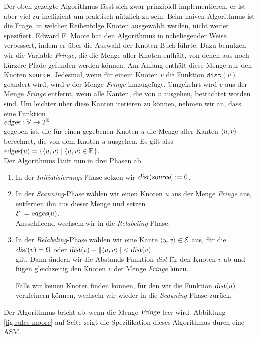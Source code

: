 \noindent
Der oben gezeigte Algorithmus l\"asst sich zwar prinzipiell implementieren, er ist aber 
viel zu ineffizient um praktisch n\"utzlich zu sein.
Beim naiven Algorithmus ist die Frage, in welcher Reihenfolge Knoten ausgew\"ahlt werden,
nicht weiter spezifiert.   Edward F. Moore \cite{moore:59} hat den Algorithmus in naheliegender Weise
verbessert,  indem er \"uber die Auswahl der Knoten Buch f\"uhrte.  
Dazu benutzen wir die Variable \textsl{Fringe}, die die Menge aller Knoten enth\"alt, von denen aus
noch k\"urzere Pfade gefunden werden k\"onnen.  Am Anfang enth\"alt diese Menge nur den Knoten
\texttt{source}.  Jedesmal, wenn f\"ur einem Knoten $v$ die Funktion
$\mathtt{dist}(v)$ ge\"andert wird, wird $v$ der Menge \textsl{Fringe} hinzugef\"ugt.
Umgekehrt wird $v$ aus der Menge \textsl{Fringe} entfernt, wenn alle Kanten, die von $v$
ausgehen, betrachtet worden sind.  Um leichter \"uber diese Kanten iterieren zu k\"onnen,
nehmen wir an, dass eine Funktion \\[0.2cm]
\hspace*{1.3cm} $\textsl{edges}: {\mathbb V} \rightarrow 2^{{\mathbb E}}$ \\[0.2cm]
gegeben ist, die f\"ur einen gegebenen Knoten $u$ die Menge aller Kanten $\pair(u,v)$
berechnet, die von dem Knoten $u$ ausgehen.  Es gilt also \\[0.2cm]
\hspace*{1.3cm} $\textsl{edges}(u) = \{ \pair(u,v) \mid \pair(u,v) \in \edges \}$.
\\[0.2cm]
Der Algorithmus l\"auft nun in drei Phasen ab.
\begin{enumerate}
\item In der \emph{Initialisierungs}-Phase setzen wir $\textsl{dist}(\textsl{source}) := 0$.
\item In der \emph{Scanning}-Phase w\"ahlen wir einen Knoten $u$ aus der Menge \textsl{Fringe} aus,
      entfernen ihn aus dieser Menge und setzen \\[0.2cm]
      \hspace*{1.3cm} ${\cal E} := \textsl{edges}(u)$. \\[0.2cm]
      Ansschlie\3end wechseln wir in die \emph{Relabeling}-Phase.
\item In der \emph{Relabeling}-Phase w\"ahlen wir eine Kante 
      $\pair(u,v) \in {\cal E}$ aus, f\"ur die \\[0.2cm]
      \hspace*{1.3cm} $\textsl{dist}(v)=\Omega$ \quad oder \quad
      $\textsl{dist}(u) + \|\langle{}u,v\rangle\| < \textsl{dist}(v)$ \\[0.2cm]
      gilt.  Dann \"andern wir die Abstands-Funktion \textsl{dist} f\"ur den Knoten $v$ ab
      und f\"ugen gleichzeitig den Knoten $v$ der Menge \textsl{Fringe} hinzu.

      Falls wir keinen Knoten finden k\"onnen, f\"ur den wir die 
      Funktion $\textsl{dist}(u)$ verkleinern k\"onnen, wechseln wir wieder in die \emph{Scanning}-Phase zur\"uck.
\end{enumerate}
Der Algorithmus bricht ab, wenn die Menge $\textsl{Fringe}$ leer wird.
Abbildung \ref{fig:rules-moore} auf Seite \pageref{fig:rules-moore} zeigt die
Spezifikation dieses Algorithmus durch eine ASM.

